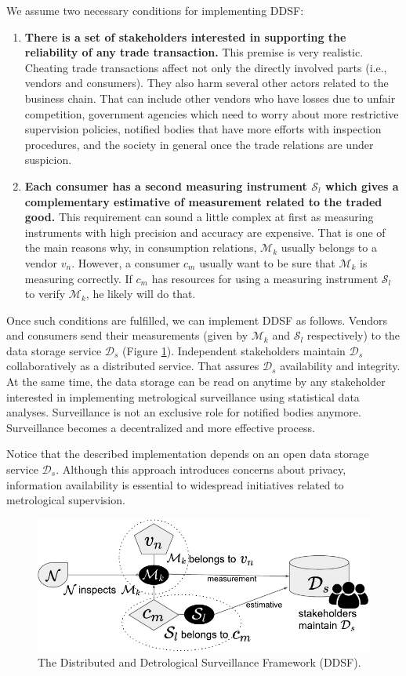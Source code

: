 \documentclass[sigplan]{acmart}
\begin{document}
We assume two necessary conditions for implementing DDSF:
\begin{enumerate}
 \item \textbf{There is a set of stakeholders interested in supporting the reliability of any trade transaction.} 
  This premise is very realistic. 
  Cheating trade transactions affect not only the directly involved parts (i.e., vendors and consumers).
  They also harm several other actors related to the business chain.
  That can include other vendors who have losses due to unfair competition, government agencies which need to worry about more restrictive supervision policies, notified bodies that have more efforts with inspection procedures, and the society in general once the trade relations are under suspicion.
 \item \textbf{Each consumer has a second measuring instrument $\mathcal{S}_l$ which gives a complementary estimative of measurement related to the traded good.} This requirement can sound a little complex at first as measuring instruments with high precision and accuracy are expensive.
 That is one of the main reasons why, in consumption relations, $\mathcal{M}_k$ usually belongs to a vendor $v_n$.
 However, a consumer $c_m$ usually want to be sure that $\mathcal{M}_k$ is measuring correctly.
 If $c_m$ has resources for using a measuring instrument $\mathcal{S}_l$ to verify $\mathcal{M}_k$, he likely will do that.
\end{enumerate}

Once such conditions are fulfilled, we can implement DDSF as follows.
Vendors and consumers send their measurements (given by $\mathcal{M}_k$ and $\mathcal{S}_l$ respectively) to the data storage service $\mathcal{D}_s$ (Figure \ref{f:basicframe2}).
Independent stakeholders maintain $\mathcal{D}_s$ collaboratively as a distributed service.
That assures $\mathcal{D}_s$ availability and integrity.
At the same time, the data storage can be read on anytime by any stakeholder interested in implementing metrological surveillance using statistical data analyses.
Surveillance is not an exclusive role for notified bodies anymore.
Surveillance becomes a decentralized and more effective process.

Notice that the described implementation depends on an open data storage service $\mathcal{D}_s$.
Although this approach introduces concerns about privacy, information availability is essential to widespread initiatives related to metrological supervision.

\begin{figure}[!t]
\centering
\includegraphics[width=.4\textwidth]{basicframe2}
\caption{The Distributed and Detrological Surveillance Framework (DDSF).}
\label{f:basicframe2}
\end{figure}
\end{document}
